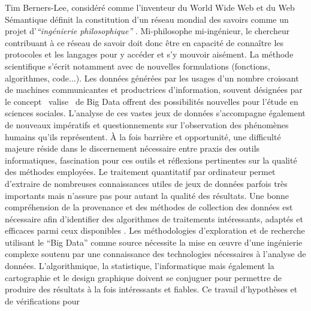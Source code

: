 Tim Berners-Lee, consid\'er\'e comme l{\textquoteright}inventeur du
World Wide Web et du Web S\'emantique d\'efinit la constitution
d{\textquoteright}un r\'eseau mondial des savoirs comme un projet
d{\textquoteright}\textit{{\textquotedblleft}ing\'enierie
philosophique{\textquotedblright} }\citep{Halpin2014}.
Mi-philosophe mi-ing\'enieur, le chercheur contribuant \`a ce r\'eseau
de savoir doit donc \^etre en capacit\'e de conna\^itre les protocoles
et les langages pour y acc\'eder et s{\textquoteright}y mouvoir
ais\'ement. La m\'ethode scientifique s{\textquoteright}\'ecrit
notamment avec de nouvelles formulations (fonctions, algorithmes,
code...). Les donn\'ees g\'en\'er\'ees par les usages
d{\textquoteright}un nombre croissant de machines communicantes et
productrices d{\textquoteright}information, souvent d\'esign\'ees par
le concept {\guillemotleft}~valise~{\guillemotright} de Big Data \citep{Lohr2012} offrent des possibilit\'es nouvelles pour
l{\textquoteright}\'etude en sciences sociales.
L{\textquoteright}analyse de ces vastes jeux de donn\'ees
s{\textquoteright}accompagne \'egalement de nouveaux imp\'eratifs et
questionnements sur l{\textquoteright}observation des ph\'enom\`enes
humains qu{\textquoteright}ils repr\'esentent. \`A la fois barri\`ere
et opportunit\'e, une difficult\'e majeure r\'eside dans le
discernement n\'ecessaire entre praxis des outils informatiques,
fascination pour ces outils et r\'eflexions pertinentes sur la
qualit\'e des m\'ethodes employ\'ees. Le traitement quantitatif par
ordinateur permet d{\textquoteright}extraire de nombreuses
connaissances utiles de jeux de donn\'ees parfois tr\`es importants
mais n{\textquoteright}assure pas pour autant la qualit\'e des
r\'esultats. Une bonne compr\'ehension de la provenance et des
m\'ethodes de collection des donn\'ees est n\'ecessaire afin
d{\textquoteright}identifier des algorithmes de traitements
int\'eressants, adapt\'es et efficaces parmi ceux disponibles
\citep{Rajaraman2011}. Les m\'ethodologies
d{\textquoteright}exploration et de recherche utilisant le
{\textquotedblleft}Big Data{\textquotedblright} comme source
n\'ecessite la mise en {\oe}uvre d{\textquoteright}une ing\'enierie
complexe soutenu par une connaissance des technologies n\'ecessaires
\`a l{\textquoteright}analyse de donn\'ees.
L{\textquoteright}algorithmique, la statistique,
l{\textquoteright}informatique mais \'egalement la cartographie et le
design graphique doivent se conjuguer pour permettre de produire des
r\'esultats \`a la fois int\'eressants et fiables. Ce travail
d{\textquoteright}hypoth\`eses et de v\'erifications pour
